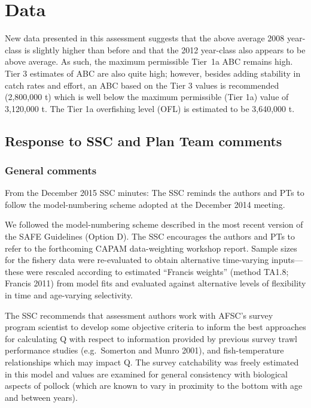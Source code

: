\hypertarget{data}{%
\section{Data}\label{data}}

New data presented in this assessment suggests that the above average
2008 year-class is slightly higher than before and that the 2012
year-class also appears to be above average. As such, the maximum
permissible Tier~1a ABC remains high. Tier 3 estimates of ABC are also
quite high; however, besides adding stability in catch rates and effort,
an ABC based on the Tier 3 values is recommended (2,800,000 t) which is
well below the maximum permissible (Tier 1a) value of 3,120,000 t. The
Tier 1a overfishing level (OFL) is estimated to be 3,640,000 t.

\hypertarget{response-to-ssc-and-plan-team-comments}{%
\subsection{Response to SSC and Plan Team
comments}\label{response-to-ssc-and-plan-team-comments}}

\hypertarget{general-comments}{%
\subsubsection{General comments}\label{general-comments}}

From the December 2015 SSC minutes: The SSC reminds the authors and PTs
to follow the model-numbering scheme adopted at the December 2014
meeting.

We followed the model-numbering scheme described in the most recent
version of the SAFE Guidelines (Option D). The SSC encourages the
authors and PTs to refer to the forthcoming CAPAM data-weighting
workshop report. Sample sizes for the fishery data were re-evaluated to
obtain alternative time-varying inputs---these were rescaled according
to estimated ``Francis weights'' (method TA1.8; Francis 2011) from model
fits and evaluated against alternative levels of flexibility in time and
age-varying selectivity.

The SSC recommends that assessment authors work with AFSC's survey
program scientist to develop some objective criteria to inform the best
approaches for calculating Q with respect to information provided by
previous survey trawl performance studies (e.g.~Somerton and Munro
2001), and fish-temperature relationships which may impact Q. The survey
catchability was freely estimated in this model and values are examined
for general consistency with biological aspects of pollock (which are
known to vary in proximity to the bottom with age and between years).

